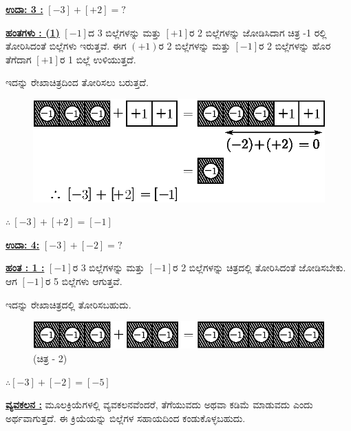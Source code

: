 \medskip
\noindent
{\textbf{\underline{ಉದಾ: 3 :}}} $[-3] + [+2] = ?$

\noindent
{\textbf{\underline{ಹಂತಗಳು : (1)}}}  $[-1]$ದ 3 ಬಿಲ್ಲೆಗಳನ್ನು ಮತ್ತು $[+1]$ರ 2 ಬಿಲ್ಲೆಗಳನ್ನು ಜೋಡಿಸಿದಾಗ ಚಿತ್ರ -1 ರಲ್ಲಿ ತೋರಿಸಿದಂತೆ ಬಿಲ್ಲೆಗಳು ಇರುತ್ತವೆ. ಈಗ $(+1)$ರ 2 ಬಿಲ್ಲೆಗಳನ್ನು ಮತ್ತು $[-1]$ರ 2 ಬಿಲ್ಲೆಗಳನ್ನು ಹೊರ ತೆಗೆದಾಗ $[+1]$ರ 1 ಬಿಲ್ಲೆ ಉಳಿಯುತ್ತದೆ.

ಇದನ್ನು ರೇಖಾಚಿತ್ರದಿಂದ ತೋರಿಸಲು ಬರುತ್ತದೆ.
\begin{figure}[H]
\centering
\includegraphics[scale=0.8]{src/figure/chap3/fig3-10b.eps}
\end{figure}
$\therefore \ [-3]+[+2]=[-1]$

\noindent
{\textbf{\underline{ಉದಾ: 4:}}} $[-3] + [-2] = ?$

\noindent
{\textbf{\underline{ಹಂತ : 1 :}}} $[-1]$ರ 3 ಬಿಲ್ಲೆಗಳನ್ನು ಮತ್ತು $[-1]$ರ 2 ಬಿಲ್ಲೆಗಳನ್ನು ಚಿತ್ರದಲ್ಲಿ ತೋರಿಸಿದಂತೆ ಜೋಡಿಸಬೇಕು. ಆಗ $[-1]$ರ 5 ಬಿಲ್ಲೆಗಳು ಆಗುತ್ತವೆ.

\eject

ಇದನ್ನು ರೇಖಾಚಿತ್ರದಲ್ಲಿ ತೋರಿಸಬಹುದು.
\begin{figure}[H]
\centering
\includegraphics{src/figure/chap3/fig3-11b.eps}
(ಚಿತ್ರ - 2)
\end{figure}

$\therefore [-3] + [-2] = [-5]$


\noindent
\medskip
{\textbf{\underline{ವ್ಯವಕಲನ :}}} ಮೂಲಕ್ರಿಯೆಗಳಲ್ಲಿ ವ್ಯವಕಲನವೆಂದರೆ, ತೆಗೆಯುವದು ಅಥವಾ ಕಡಿಮೆ ಮಾಡು\-ವದು ಎಂದು ಅರ್ಥವಾಗುತ್ತದೆ. ಈ ಕ್ರಿಯೆಯನ್ನು ಬಿಲ್ಲೆಗಳ ಸಹಾಯದಿಂದ ಕಂಡುಕೊಳ್ಳ\break ಬಹುದು.

